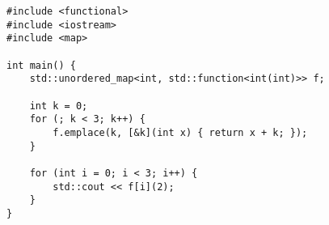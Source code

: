 \begin{lstlisting}[title=\href{https://godbolt.org/z/-FTWqI}{\texttt{godbolt.org/z/-FTWqI}}]
#include <functional>
#include <iostream>
#include <map>

int main() {
    std::unordered_map<int, std::function<int(int)>> f;
    
    int k = 0;
    for (; k < 3; k++) {
        f.emplace(k, [&k](int x) { return x + k; });
    }

    for (int i = 0; i < 3; i++) {
        std::cout << f[i](2);
    }
}
\end{lstlisting}
